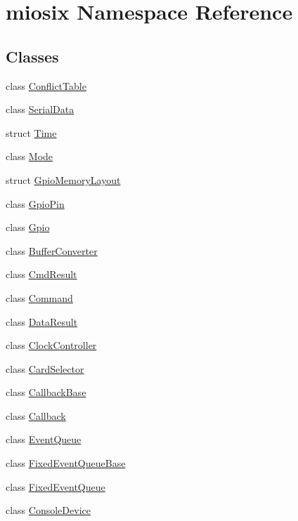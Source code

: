 \hypertarget{namespacemiosix}{\section{miosix Namespace Reference}
\label{namespacemiosix}
}
\subsection*{Classes}
\begin{DoxyCompactItemize}
\item 
class \hyperlink{classmiosix_1_1_conflict_table}{Conflict\-Table}
\item 
class \hyperlink{classmiosix_1_1_serial_data}{Serial\-Data}
\item 
struct \hyperlink{structmiosix_1_1_time}{Time}
\item 
class \hyperlink{classmiosix_1_1_mode}{Mode}
\item 
struct \hyperlink{structmiosix_1_1_gpio_memory_layout}{Gpio\-Memory\-Layout}
\item 
class \hyperlink{classmiosix_1_1_gpio_pin}{Gpio\-Pin}
\item 
class \hyperlink{classmiosix_1_1_gpio}{Gpio}
\item 
class \hyperlink{classmiosix_1_1_buffer_converter}{Buffer\-Converter}
\item 
class \hyperlink{classmiosix_1_1_cmd_result}{Cmd\-Result}
\item 
class \hyperlink{classmiosix_1_1_command}{Command}
\item 
class \hyperlink{classmiosix_1_1_data_result}{Data\-Result}
\item 
class \hyperlink{classmiosix_1_1_clock_controller}{Clock\-Controller}
\item 
class \hyperlink{classmiosix_1_1_card_selector}{Card\-Selector}
\item 
class \hyperlink{classmiosix_1_1_callback_base}{Callback\-Base}
\item 
class \hyperlink{classmiosix_1_1_callback}{Callback}
\item 
class \hyperlink{classmiosix_1_1_event_queue}{Event\-Queue}
\item 
class \hyperlink{classmiosix_1_1_fixed_event_queue_base}{Fixed\-Event\-Queue\-Base}
\item 
class \hyperlink{classmiosix_1_1_fixed_event_queue}{Fixed\-Event\-Queue}
\item 
class \hyperlink{classmiosix_1_1_console_device}{Console\-Device}
\item 

\end{DoxyCompactItemize}
